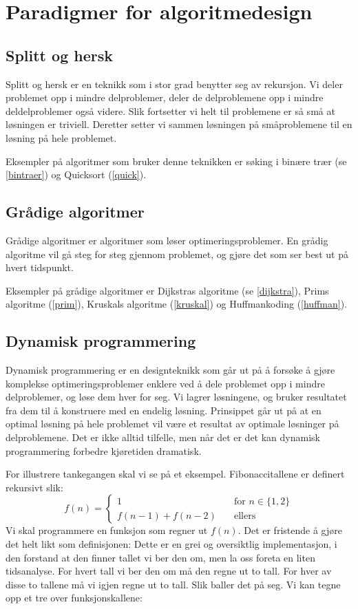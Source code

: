\section{Paradigmer for algoritmedesign}

\subsection{Splitt og hersk}
Splitt og hersk er en teknikk som i stor grad benytter seg av rekursjon. Vi deler problemet opp i mindre delproblemer, deler de delproblemene opp i mindre deldelproblemer også videre. Slik fortsetter vi helt til problemene er så små at løsningen er triviell. Deretter setter vi sammen løsningen på småproblemene til en løsning på hele problemet. 

Eksempler på algoritmer som bruker denne teknikken er søking i binære trær (se \ref{bintraer}) og Quicksort (\ref{quick}).


\subsection{Grådige algoritmer}
Grådige algoritmer er algoritmer som løser optimeringsproblemer. En grådig algoritme vil gå steg for steg gjennom problemet, og gjøre det som ser best ut på hvert tidspunkt.

Eksempler på grådige algoritmer er Dijkstras algoritme (se \ref{dijkstra}), Prims algoritme (\ref{prim}), Kruskals algoritme (\ref{kruskal}) og Huffmankoding (\ref{huffman}).



\subsection{Dynamisk programmering}
Dynamisk programmering er en designteknikk som går ut på å forsøke å gjøre komplekse optimeringsproblemer enklere ved å dele problemet opp i mindre delproblemer, og løse dem hver for seg. Vi lagrer løsningene, og bruker resultatet fra dem til å konstruere med en endelig løsning. Prinsippet går ut på at en optimal løsning på hele problemet vil være et resultat av optimale løsninger på delproblemene. Det er ikke alltid tilfelle, men når det er det kan dynamisk programmering forbedre kjøretiden dramatisk.

For illustrere tankegangen skal vi se på et eksempel. Fibonaccitallene er definert rekursivt slik:
\[ f(n) =	\left\{
	\begin{array}{ll}
		1 \quad& \text{for } n \in \{1, 2\} \\
		f(n-1) + f(n-2) \quad& \text{ellers} 
	\end{array}
	\right. \]
Vi skal programmere en funksjon som regner ut $ f(n) $. Det er fristende å gjøre det helt likt som definisjonen:
Dette er en grei og oversiktlig implementasjon, i den forstand at den finner tallet vi ber den om, men la oss foreta en liten tidsanalyse. For hvert tall vi ber den om må den regne ut to tall. For hver av disse to tallene må vi igjen regne ut to tall. Slik baller det på seg. Vi kan tegne opp et tre over funksjonskallene:

